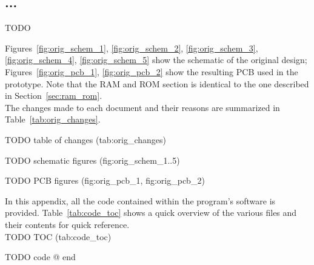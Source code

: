 \documentclass{scrartcl}
\begin{document}
	\subsection{...}
	TODO


	Figures~\ref{fig:orig_schem_1}, \ref{fig:orig_schem_2}, \ref{fig:orig_schem_3}, \ref{fig:orig_schem_4}, \ref{fig:orig_schem_5} show the schematic of the original design; Figures~\ref{fig:orig_pcb_1}, \ref{fig:orig_pcb_2} show the resulting PCB used in the prototype. Note that the RAM and ROM section is identical to the one described in Section~\ref{sec:ram_rom}. \\
	The changes made to each document and their reasons are summarized in Table~\ref{tab:orig_changes}.

	TODO table of changes (tab:orig_changes)

	TODO schematic figures (fig:orig_schem_1..5)

	TODO PCB figures (fig:orig_pcb_1, fig:orig_pcb_2)

	In this appendix, all the code contained within the program's software is provided. Table~\ref{tab:code_toc} shows a quick overview of the various files and their contents for quick reference.\\

	TODO TOC (tab:code_toc)

	TODO code @ end
	
	
\end{document}
